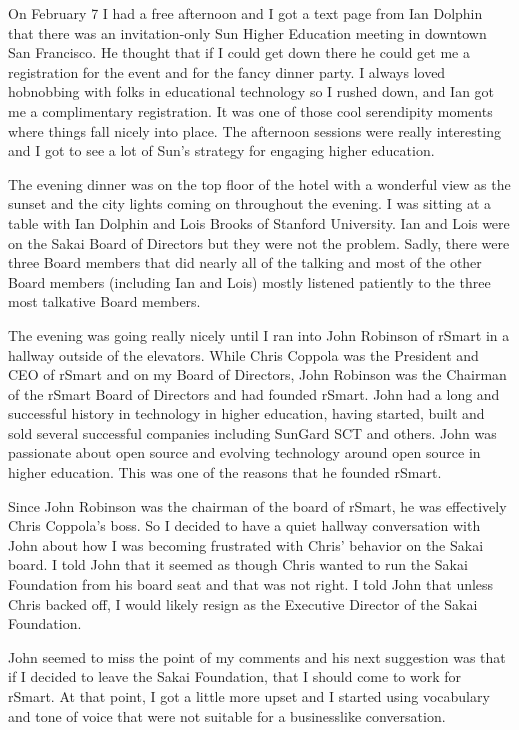 \documentclass[12pt]{book}
\begin{document}
On February 7 I had a free afternoon and I got a text page from Ian Dolphin that
there was an invitation-only Sun Higher Education meeting in downtown San
Francisco.  He thought that if I could get down there he could get me a
registration for the event and for the fancy dinner party.   I always loved
hobnobbing with folks in educational technology so I rushed down, and
Ian got me a complimentary registration.   It was one of those cool
serendipity moments where things fall nicely into place.
The afternoon sessions were really interesting
and I got to see a lot of Sun's strategy for engaging higher education.

The evening dinner was on the top floor of the hotel with a wonderful view
as the sunset and the city lights coming on throughout the evening.   I was
sitting at a table with Ian Dolphin and Lois Brooks of Stanford University.
Ian and Lois were on the Sakai Board of Directors but they were not the problem.
Sadly, there were three Board members that did nearly all of the talking and
most of the other Board members (including Ian and Lois) mostly listened
patiently to the three most talkative Board members.

The evening was going really nicely until I ran into John Robinson of rSmart
in a hallway outside of the elevators.  While Chris Coppola was the
President and CEO of rSmart and on my Board of Directors, John Robinson
was the Chairman of the rSmart Board of Directors and had founded rSmart.
John had a long and successful history
in technology in higher education, having started, built and sold several
successful companies including SunGard SCT and others.   John was
passionate about open source and evolving technology around open source in
higher education.   This was one of the reasons that he founded rSmart.

Since John Robinson was the chairman of the board of rSmart, he was effectively
Chris Coppola's boss.   So I decided to have a quiet hallway conversation with
John about how I was becoming frustrated with Chris' behavior on the Sakai board.
I told John that it seemed as though Chris wanted to run the Sakai Foundation
from his board seat and that was not right.  I told John that unless Chris backed
off, I would likely resign as the Executive Director of the Sakai Foundation.

John seemed to miss the point of my comments and his next suggestion was that if
I decided to leave the Sakai Foundation, that I should come to work for rSmart.
At that point, I got a little more upset and I started using vocabulary and tone of voice that were
not suitable for a businesslike conversation.
\end{document}
